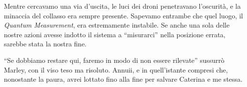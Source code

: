 \begin{center}
\begin{minipage}{0.7\textwidth}
    \centering
\end{minipage}
\end{center}

Mentre cercavamo una via d'uscita, le luci dei droni penetravano l'oscurità, e la minaccia del collasso era sempre presente. Sapevamo entrambe che quel luogo, il \textit{Quantum Measurement}, era estremamente instabile. Se anche una sola delle nostre azioni avesse indotto il sistema a \enquote{misurarci} nella posizione errata, sarebbe stata la nostra fine.

\enquote{Se dobbiamo restare qui, faremo in modo di non essere rilevate} sussurrò Marley, con il viso teso ma risoluto. Annuii, e in quell'istante compresi che, nonostante la paura, avrei lottato fino alla fine per salvare Caterina e me stessa.

